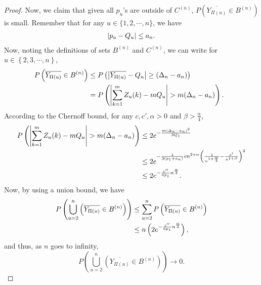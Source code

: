 \begin{proof}
Now, we claim that given all $p_u$'s are outside of $C^{(n)}$, $P\left(\overline{Y_{\Pi (u)}} \in B^{(n)}\right)$ is small. Remember that for any $u \in \{1,2,\cdots, n \}$, we have
\begin{align}
\no |p_u-{Q}_u| \leq a_n.
\end{align}
Now, noting the definitions of sets $B^{(n)}$ and $C^{(n)}$, we can write for $u \in \left\{2,3,  \cdots , n\right\}$,
\begin{align}
\nonumber
\no P\left(\overline{Y_{\Pi(u)}} \in B^{(n)}\right) &\leq P\left(\abs*{\overline{Y_{\Pi(u)}}-Q_u}\geq  (\Delta_n-a_n) \right)\\
\nonumber &= P\left(\abs*{\sum\limits_{k=1}^{m}Z_u(k)-mQ_u}> m(\Delta_n-a_n) \right).\ \
\end{align}
According to the Chernoff bound, for any $c,c',\alpha>0$ and $\beta>\frac{\alpha}{4}$,
\begin{align}
\no P\left(\abs*{\sum\limits_{k=1}^{m}Z_u(k)-mQ_u}> m(\Delta_n-a_n) \right) &\leq 2e^{-\frac{m(\Delta_n-a_n)^2}{3Q_1}} \\
\nonumber &\leq 2e^{-\frac{1}{3(p_1+a_n)}cn^{2+\alpha}\left(\frac{1}{n^{1+\frac{\alpha}{4}}}- \frac{c'}{n^{1 +  \beta}}\right)^2}\\
\nonumber &\leq 2e^{-\frac{c''}{6 p_1}n^{\frac{\alpha}{2}}}. \ \
\end{align}
Now, by using a union bound, we have
\begin{align}
\no P\left( \bigcup\limits_{u=2}^n \left(\overline{Y_{\Pi(u)}}\in B^{(n)}\right)\right)&\leq \sum\limits_{u=2}^{n}P\left(\overline{Y_{\Pi(u)}}\in B^{(n)}\right)\\
\nonumber &\leq n\left(2e^{-\frac{c''}{6 p_1}n^{\frac{\alpha}{2}}}\right),\ \
\end{align}
and thus, as $n$ goes to infinity,
\[P\left( \bigcup\limits_{u=2}^n \left(\overline{Y_{\Pi(u)}}\in B^{(n)}\right)\right) \rightarrow 0.\]


\end{proof}
